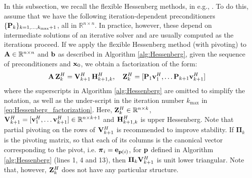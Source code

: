 \documentclass[11pt]{article}
\numberwithin{equation}{section}
\newcommand{\bfPi}{{\boldsymbol{\Pi}}}
\newcommand{\bfpi}{{\boldsymbol{\pi}}}
\newcommand{\bfA}{{\bf A}}
\newcommand{\bfH}{{\bf H}}
\newcommand{\bfP}{{\bf P}}
\newcommand{\bfV}{{\bf V}}
\newcommand{\bfZ}{{\bf Z}}
\newcommand{\bfb}{{\bf b}}
\newcommand{\bfe}{{\bf e}}
\newcommand{\bfp}{{\bf p}}
\newcommand{\bfv}{{\bf v}}
\newcommand{\bfx}{{\bf x}}
\begin{document}
In this subsection, we recall the flexible Hessenberg methods, in e.g., \cite{Zhang2013CMRHflexible}. To do this, assume that we have the following iteration-dependent preconditioners $\{\bfP_{k}\}_{k=1,\dots,k_{\max}+1}$, all in $\mathbb{R}^{n \times n}$. In practice, however, these depend on intermediate solutions of an iterative solver and are usually computed as the iterations proceed. If we apply the flexible Hessenberg method (with pivoting) to $\bfA \in \mathbb{R}^{n \times n}$ and $\bfb$ as described in Algorithm \ref{alg:Hessenberg}, given the sequence of preconditioners and $\bfx_0$, we obtain a factorization of the form:
\begin{equation}\label{eq:Hessenberg_factorization}
    \bfA \, \bfZ^{H}_{k} = \bfV^{H}_{k+1}  \, \bfH^{H}_{k+1,k}, \quad \bfZ^{H}_{k} = [\bfP_1 \bfv^{H}_1,\dots \bfP_{k+1}\bfv^{H}_{k+1}] 
\end{equation}
where the superscripts in Algorithm \ref{alg:Hessenberg} are omitted to simplify the notation, as well as the under-script in the iteration number $k_{\max}$ in \eqref{eq:Hessenberg_factorization}. Here, $\bfZ^{H}_{k}\in\mathbb{R}^{n\times k}$, $\bfV^{H}_{k+1}=[\bfv^{H}_1,\dots \bfv^{H}_{k+1}]\in\mathbb{R}^{n\times k+1}$ and $\bfH^{H}_{k+1,k}$ is upper Hessenberg.
Note that partial pivoting on the rows of $\bfV^{H}_{k+1}$ is recommended to improve  stability. If $\bfPi_k$ is the pivoting matrix, so that each of its columns is the canonical vector corresponding to the pivot, i.e. $\bfpi_i=\bfe_{\bfp(i)}$, for $\bfp$ defined in Algorithm \ref{alg:Hessenberg} (lines 1, 4 and 13), then $\bfPi_k \bfV^{H}_{k+1}$ is unit lower triangular. Note that, however, $\bfZ^{H}_{k}$ does not have any particular structure.
\end{document}
